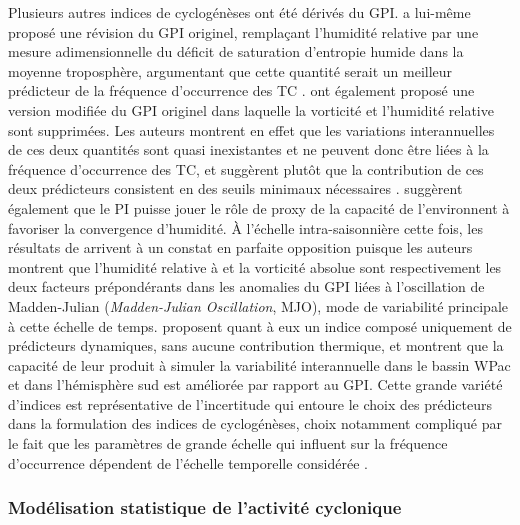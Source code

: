 \documentclass[../main.tex]{subfiles}
\begin{document}
Plusieurs autres indices de cyclogénèses ont été dérivés du GPI. \textcite{emanuel_tropical_2010} a lui-même proposé une révision du GPI originel, remplaçant
l'humidité relative par une mesure adimensionnelle du déficit de saturation d'entropie humide dans la moyenne troposphère, argumentant que cette quantité serait
un meilleur prédicteur de la fréquence d'occurrence des TC \parencite{emanuel_hurricanes_2008}. \textcite{bruyere_investigating_2012} ont également proposé une
version modifiée du GPI originel dans laquelle la vorticité et l'humidité relative sont supprimées. Les auteurs montrent en effet que les variations
interannuelles de ces deux quantités sont quasi inexistantes et ne peuvent donc être liées à la fréquence d'occurrence des TC, et suggèrent plutôt que la
contribution de ces deux prédicteurs consistent en des seuils minimaux nécessaires \parencite{mcgauley_measuring_2011}. \citeauthor{bruyere_investigating_2012}
suggèrent également que le PI puisse jouer le rôle de proxy de la capacité de l'environnent à favoriser la convergence d'humidité. À l'échelle intra-saisonnière
cette fois, les résultats de \textcite{camargo_diagnosis_2009} arrivent à un constat en parfaite opposition puisque les auteurs montrent que l'humidité relative
à  et la vorticité absolue sont respectivement les deux facteurs prépondérants dans les anomalies du GPI liées à l'oscillation de Madden-Julian
(\textit{Madden-Julian Oscillation}, MJO), mode de variabilité principale à cette échelle de temps. \textcite{wang_dynamic_2020} proposent quant à eux un indice
composé uniquement de prédicteurs dynamiques, sans aucune contribution thermique, et montrent que la capacité de leur produit à simuler la variabilité
interannuelle dans le bassin WPac et dans l'hémisphère sud est améliorée par rapport au GPI. Cette grande variété d'indices est représentative de l'incertitude
qui entoure le choix des prédicteurs dans la formulation des indices de cyclogénèses, choix notamment compliqué par le fait que les paramètres de grande échelle
qui influent sur la fréquence d'occurrence dépendent de l'échelle temporelle considérée \parencite{wang_anomalous_2017}.

\subsubsection{Modélisation statistique de l'activité cyclonique}\label{sec:modelisation_stat}
\end{document}
